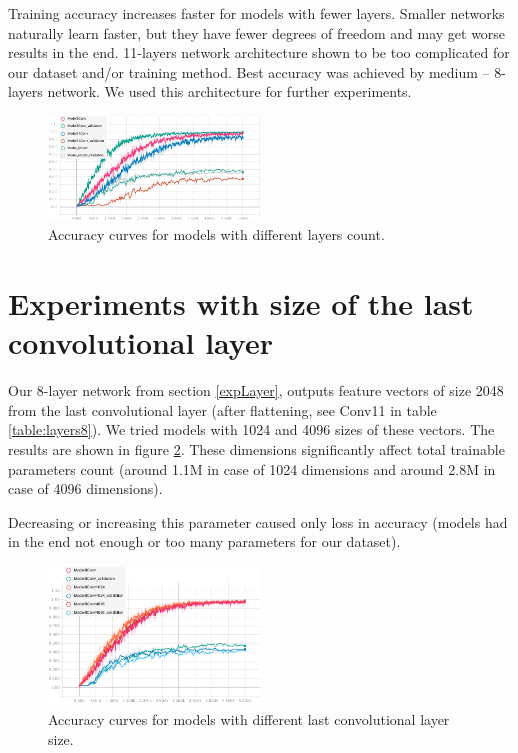 \documentclass[a4paper]{article}
\begin{document}
Training accuracy increases faster for models with fewer layers.
Smaller networks naturally learn faster, but they have fewer degrees of freedom
and may get worse results in the end.
11-layers network architecture shown to be too complicated for
our dataset and/or training method.
Best accuracy was achieved by medium -- 8-layers network.
We used this architecture for further experiments.

\begin{figure}[!h]
    \centering
    \includegraphics[page=2,width=0.5\textwidth]{curvesLayers.png}
    \caption[]{Accuracy curves for models with different layers count.
    \label{fig:layersAcc}
   	}
\end{figure}

\section{Experiments with size of the last convolutional layer}

Our 8-layer network from section \ref{expLayer}, outputs
feature vectors of size 2048 from the last convolutional layer (after flattening, see Conv11 in table \ref{table:layers8}).
We tried models with 1024 and 4096 sizes of these vectors.
The results are shown in figure \ref{fig:lastSize}.
These dimensions significantly affect total trainable parameters count
(around 1.1M in case of 1024 dimensions and around 2.8M in case of 4096 dimensions).

Decreasing or increasing this parameter caused only loss in accuracy
(models had in the end not enough or too many parameters for our dataset).

\begin{figure}[!h]
    \centering
    \includegraphics[page=2,width=0.5\textwidth]{lastConvSize.png}
    \caption[]{Accuracy curves for models with different last convolutional layer size.
    \label{fig:lastSize}
    }
\end{figure}
\end{document}
